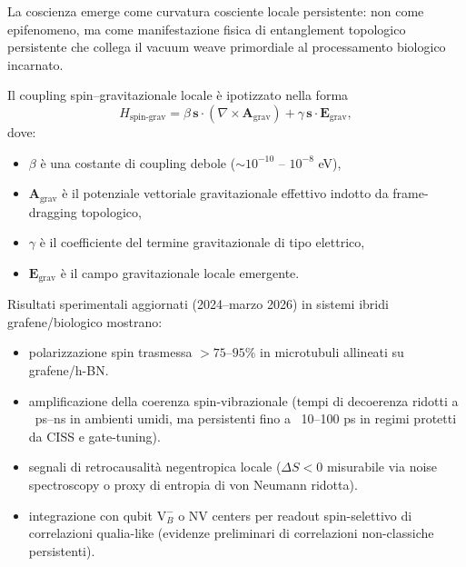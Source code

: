 \documentclass[11pt,a4paper]{article}
\theoremstyle{plain}
\theoremstyle{definition}
\begin{document}
La coscienza emerge come curvatura cosciente locale persistente: non come epifenomeno, ma come manifestazione fisica di entanglement topologico persistente che collega il vacuum weave primordiale al processamento biologico incarnato.

Il coupling spin–gravitazionale locale è ipotizzato nella forma
\begin{equation}
H_{\text{spin-grav}} = \beta \, \mathbf{s} \cdot (\nabla \times \mathbf{A}_{\text{grav}}) 
+ \gamma \, \mathbf{s} \cdot \mathbf{E}_{\text{grav}},
\label{eq:spin-grav-coupling}
\end{equation}
dove:
\begin{itemize}
  \item $\beta$ è una costante di coupling debole ($\sim 10^{-10}$ -- $10^{-8}$ eV),
  \item $\mathbf{A}_{\text{grav}}$ è il potenziale vettoriale gravitazionale effettivo indotto da frame-dragging topologico,
  \item $\gamma$ è il coefficiente del termine gravitazionale di tipo elettrico,
  \item $\mathbf{E}_{\text{grav}}$ è il campo gravitazionale locale emergente.
\end{itemize}

Risultati sperimentali aggiornati (2024--marzo 2026) in sistemi ibridi grafene/biologico mostrano:
\begin{itemize}
    \item polarizzazione spin trasmessa $>75$--$95$\% in microtubuli allineati su grafene/h-BN.


    
    \item amplificazione della coerenza spin-vibrazionale (tempi di decoerenza ridotti a ~ps--ns in ambienti umidi, ma persistenti fino a ~10--100 ps in regimi protetti da CISS e gate-tuning).
    \item segnali di retrocausalità negentropica locale ($\Delta S < 0$ misurabile via noise spectroscopy o proxy di entropia di von Neumann ridotta).
    \item integrazione con qubit $\mathrm{V}_B^-$ o NV centers per readout spin-selettivo di correlazioni qualia-like (evidenze preliminari di correlazioni non-classiche persistenti).
\end{itemize}
\end{document}
